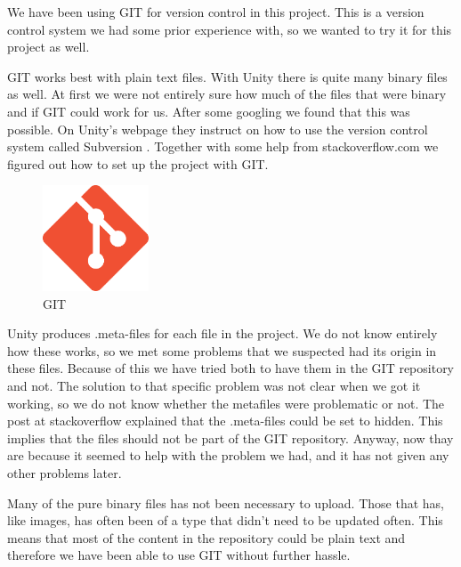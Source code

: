 We have been using GIT for version control in this project. This is a version
control system we had some prior experience with, so we wanted to try it for 
this project as well. 

GIT works best with plain text files. With Unity there is quite many binary
files as well. At first we were not entirely sure how much of the files that
were binary and if GIT could work for us. After some googling we found that 
this was possible. On Unity's webpage they instruct on how to use the version
control system called Subversion \cite{SubversionControl}. Together with some
help from stackoverflow.com\cite{gitVersionControl} we figured out how to set 
up the project with GIT.

\begin{figure}
	\capstart
	\centering
	\vspace{-10pt}
	\includegraphics[width=0.28\textwidth]{images/git}
	\vspace{-5pt}
	\caption[GIT logo]{GIT}
	\label{fig:git}
	\vspace{-10pt}
\end{figure}

Unity produces .meta-files for each file in the project. We do not know 
entirely how these works, so we met some problems that we suspected had its
origin in these files. Because of this we have tried both to have them in
the GIT repository and not. The solution to that specific problem was not
clear when we got it working, so we do not know whether the metafiles were
problematic or not. The post at stackoverflow explained that the .meta-files 
could be set to hidden. This implies that the files should not be part
of the GIT repository. Anyway, now thay are because it seemed to help with the
problem we had, and it has not given any other problems later.

Many of the pure binary files has not been necessary to upload. Those that
has, like images, has often been of a type that didn't need to be updated
often. This means that most of the content in the repository could be plain
text and therefore we have been able to use GIT without further hassle.

